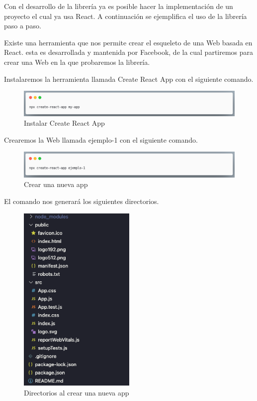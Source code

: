 Con el desarrollo de la librería ya es posible hacer la implementación de un proyecto el cual ya usa React.
A continuación se ejemplifica el uso de la librería paso a paso.

Existe una herramienta que nos permite crear el esqueleto de una Web basada en React. \cite{CRA} esta es desarrollada y mantenida por Facebook, de la cual partiremos para crear una Web en la que probaremos la librería.

Instalaremos la herramienta llamada Create React App con el siguiente comando.
\newline
\begin{figure}[H]
    \includegraphics[width=1\textwidth]{./Imagenes/9.1.png}
    \caption[Instalar Create React App]{Instalar Create React App}
    \end{figure}
\newline

Crearemos la Web llamada ejemplo-1 con el siguiente comando.
\newline
\begin{figure}[H]
    \includegraphics[width=1\textwidth]{./Imagenes/9.2.png}
    \caption[Crear una nueva app]{Crear una nueva app}
    \end{figure}
\newline

El comando nos generará los siguientes directorios.
\newline
\begin{figure}[H]
    \includegraphics[width=0.5\textwidth]{./Imagenes/9.3.png}
   \centering 
    \caption[Directorios al crear una nueva app]{Directorios al crear una nueva app}
    \end{figure}
\newline

